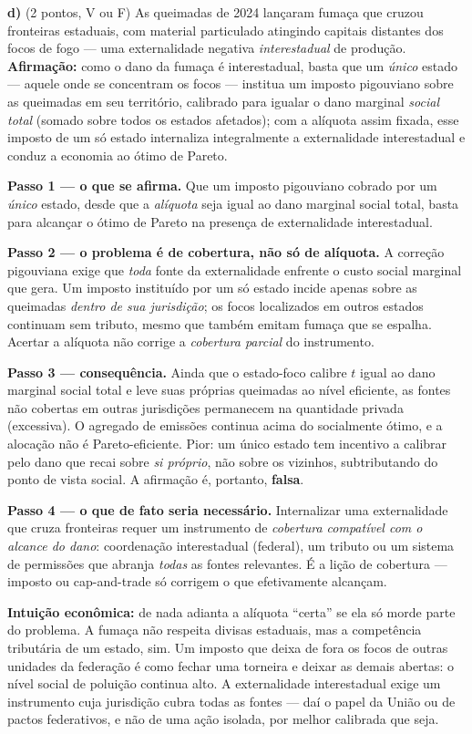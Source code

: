 \textbf{d)} (2 pontos, V ou F) As queimadas de 2024 lançaram fumaça que cruzou fronteiras estaduais, com material particulado atingindo capitais distantes dos focos de fogo --- uma externalidade negativa \emph{interestadual} de produção. \textbf{Afirmação:} como o dano da fumaça é interestadual, basta que um \emph{único} estado --- aquele onde se concentram os focos --- institua um imposto pigouviano sobre as queimadas em seu território, calibrado para igualar o dano marginal \emph{social total} (somado sobre todos os estados afetados); com a alíquota assim fixada, esse imposto de um só estado internaliza integralmente a externalidade interestadual e conduz a economia ao ótimo de Pareto.

\begin{solucao}
\textbf{Passo 1 --- o que se afirma.} Que um imposto pigouviano cobrado por um \emph{único} estado, desde que a \emph{alíquota} seja igual ao dano marginal social total, basta para alcançar o ótimo de Pareto na presença de externalidade interestadual.

\textbf{Passo 2 --- o problema é de cobertura, não só de alíquota.} A correção pigouviana exige que \emph{toda} fonte da externalidade enfrente o custo social marginal que gera. Um imposto instituído por um só estado incide apenas sobre as queimadas \emph{dentro de sua jurisdição}; os focos localizados em outros estados continuam sem tributo, mesmo que também emitam fumaça que se espalha. Acertar a alíquota não corrige a \emph{cobertura parcial} do instrumento.

\textbf{Passo 3 --- consequência.} Ainda que o estado-foco calibre $t$ igual ao dano marginal social total e leve suas próprias queimadas ao nível eficiente, as fontes não cobertas em outras jurisdições permanecem na quantidade privada (excessiva). O agregado de emissões continua acima do socialmente ótimo, e a alocação não é Pareto-eficiente. Pior: um único estado tem incentivo a calibrar pelo dano que recai sobre \emph{si próprio}, não sobre os vizinhos, subtributando do ponto de vista social. A afirmação é, portanto, \textbf{falsa}.

\textbf{Passo 4 --- o que de fato seria necessário.} Internalizar uma externalidade que cruza fronteiras requer um instrumento de \emph{cobertura compatível com o alcance do dano}: coordenação interestadual (federal), um tributo ou um sistema de permissões que abranja \emph{todas} as fontes relevantes. É a lição de cobertura --- imposto ou cap-and-trade só corrigem o que efetivamente alcançam.

\textbf{Intuição econômica:} de nada adianta a alíquota ``certa'' se ela só morde parte do problema. A fumaça não respeita divisas estaduais, mas a competência tributária de um estado, sim. Um imposto que deixa de fora os focos de outras unidades da federação é como fechar uma torneira e deixar as demais abertas: o nível social de poluição continua alto. A externalidade interestadual exige um instrumento cuja jurisdição cubra todas as fontes --- daí o papel da União ou de pactos federativos, e não de uma ação isolada, por melhor calibrada que seja.
\end{solucao}

